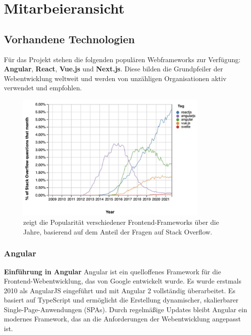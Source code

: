 \section{Mitarbeieransicht}

\subsection{Vorhandene Technologien}
Für das Projekt stehen die folgenden populären Webframeworks zur Verfügung: \textbf{Angular}, \textbf{React}, \textbf{Vue.js} und \textbf{Next.js}. Diese bilden die Grundpfeiler der Webentwicklung weltweit und werden von unzähligen Organisationen aktiv verwendet und empfohlen.

\begin{figure}
	\centering
	\includegraphics[width=0.85\textwidth]{images/framework_popularity.png}
	\caption{zeigt die Popularität verschiedener Frontend-Frameworks über die Jahre, basierend auf dem Anteil der Fragen auf Stack Overflow. \textit{\cite{akivab_js_framework}}}
\end{figure}


\subsubsection{Angular}

\textbf{Einführung in Angular}
\newline
Angular ist ein quelloffenes Framework für die Frontend-Webentwicklung, das von Google entwickelt wurde. Es wurde erstmals 2010 als AngularJS eingeführt und mit Angular 2 vollständig überarbeitet. Es basiert auf TypeScript und ermöglicht die Erstellung dynamischer, skalierbarer Single-Page-Anwendungen (SPAs). Durch regelmäßige Updates bleibt Angular ein modernes Framework, das an die Anforderungen der Webentwicklung angepasst ist.\textit{\cite{madurapperuma2022state, shetty2020review, angular}} \newline


